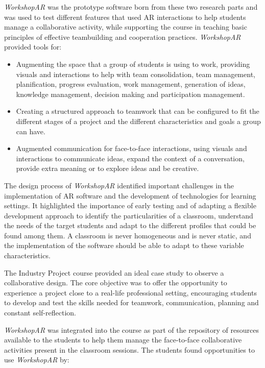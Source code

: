 \emph{WorkshopAR} was the prototype software born from these two research parts and was used to test different features that used \ac{AR} interactions to help students manage a
collaborative activity, while supporting the course in teaching basic principles of effective teambuilding and cooperation practices. \emph{WorkshopAR} provided tools for:

\begin{itemize}
    \item Augmenting the space that a group of students is using to work, providing visuals and interactions to help with team consolidation, team management, planification,
    progress evaluation, work management, generation of ideas, knowledge management, decision making and participation management.
    \item Creating a structured approach to teamwork that can be configured to fit the different stages of a project and the different characteristics and goals a group can have.
    \item Augmented communication for face-to-face interactions, using visuals and interactions to communicate ideas, expand the context of a conversation, provide extra
    meaning or to explore ideas and be creative.
\end{itemize}

The design process of \emph{WorkshopAR} identified important challenges in the implementation of \ac{AR} software and the development of technologies for learning settings.
It highlighted the importance of early testing and of adapting a flexible development approach to identify the particularities of a classroom, understand the needs of the
target students and adapt to the different profiles that could be found among them. A classroom is never homogeneous and is never static, and the implementation of the
software should be able to adapt to these variable characteristics.

The Industry Project course provided an ideal case study to observe a collaborative design. The core objective was to offer the opportunity to experience a project close to
a real-life professional setting, encouraging students to develop and test the skills needed for teamwork, communication, planning and constant self-reflection.

\emph{WorkshopAR} was integrated into the course as part of the repository of resources available to the students to help them manage the face-to-face collaborative
activities present in the classroom sessions. The students found opportunities to use \emph{WorkshopAR} by:

